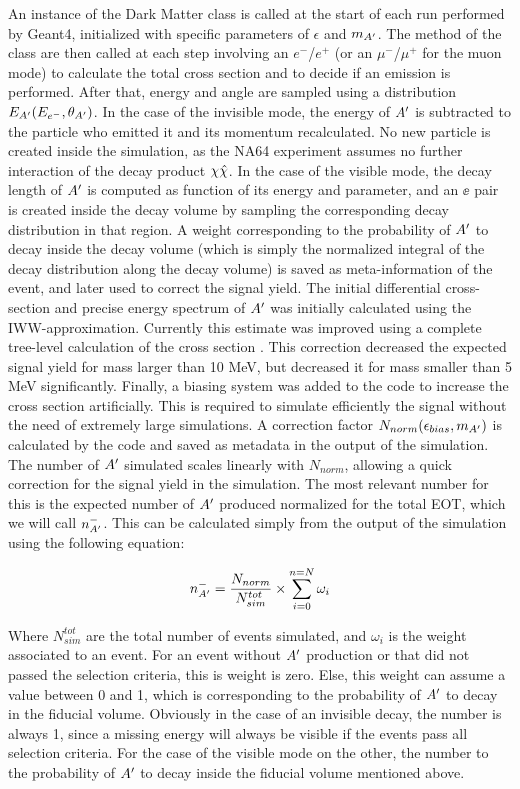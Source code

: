 An instance of the Dark Matter class is called at the start of each run performed by Geant4, initialized with specific parameters of $\epsilon$ and $m_{A'}$. The method of the class are then called at each step involving an $e^-$/$e^+$ (or an $\mu^-$/$\mu^+$ for the muon mode) to calculate the total cross section and to decide if an emission is performed. After that, energy and angle are sampled using a distribution $E_{A'}(E_{e^-}, \theta_{A'})$. In the case of the invisible mode, the energy of $A'$ is subtracted to the particle who emitted it and its momentum recalculated. No new particle is created inside the simulation, as the NA64 experiment assumes no further interaction of the decay product $\chi \hat{\chi}$. In the case of the visible mode, the decay length of $A'$ is computed as function of its energy and parameter, and an $\ee$ pair is created inside the decay volume by sampling the corresponding decay distribution in that region. A weight corresponding to the probability of $A'$ to decay inside the decay volume (which is simply the normalized integral of the decay distribution along the decay volume) is saved as meta-information of the event, and later used to correct the signal yield.
The initial differential cross-section and precise energy spectrum of $A'$ was initially calculated using the IWW-approximation. Currently this estimate was improved using a complete tree-level calculation of the cross section \cite{DMsimulation}. This correction decreased the expected signal yield for mass larger than 10 MeV, but decreased it for mass smaller than 5 MeV significantly. Finally, a biasing system was added to the code to increase the cross section artificially. This is required to simulate efficiently the signal without the need of extremely large simulations. A correction factor $N_{norm}(\epsilon_{bias},m_{A'})$ is calculated by the code and saved as metadata in the output of the simulation. The number of $A'$ simulated scales linearly with $N_{norm}$, allowing a quick correction for the signal yield in the simulation. The most relevant number for this is the expected number of $A'$ produced normalized for the total EOT, which we will call $n^-_{A'}$. This can be calculated simply from the output of the simulation using the following equation:

\begin{equation}
  \label{eq:1}
  n^-_{A'} = \frac{N_{norm}}{N^{tot}_{sim}} \times \sum^{n=N}_{i=0} \omega_i
\end{equation}

Where $N^{tot}_{sim}$ are the total number of events simulated, and $\omega_i$ is the weight associated to an event. For an event without $A'$ production or that did not passed the selection criteria, this is weight is zero. Else, this weight can assume a value between 0 and 1, which is corresponding to the probability of $A'$ to decay in the fiducial volume. Obviously in the case of an invisible decay, the number is always 1, since a missing energy will always be visible if the events pass all selection criteria. For the case of the visible mode on the other, the number to the probability of $A'$ to decay inside the fiducial volume mentioned above.


